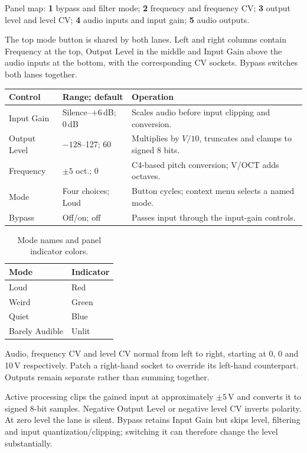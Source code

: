 Panel map: \textbf{1} bypass and filter mode;
\textbf{2} frequency and frequency CV;
\textbf{3} output level and level CV;
\textbf{4} audio inputs and input gain;
\textbf{5} audio outputs.

The top mode button is shared by both lanes. Left and right columns contain
Frequency at the top, Output Level in the middle and Input Gain above the
audio inputs at the bottom, with the corresponding CV sockets.
Bypass switches both lanes together.

\begin{tabularx}{\textwidth}{@{}l l X@{}}
\toprule Control & Range; default & Operation \\\midrule
Input Gain & Silence--$+6$\,dB; 0\,dB & Scales audio before input clipping and conversion. \\
Output Level & $-128$--127; 60 & Multiplies by $V/10$, truncates and clamps to signed 8 bits. \\
Frequency & $\pm5$ oct.; 0 & C4-based pitch conversion; V/OCT adds octaves. \\
Mode & Four choices; Loud & Button cycles; context menu selects a named mode. \\
Bypass & Off/on; off & Passes input through the input-gain controls. \\
\bottomrule
\end{tabularx}


\begin{table}[ht]\centering
\begin{tabular}{@{}ll@{}}
\toprule Mode & Indicator \\\midrule
Loud & Red \\
Weird & Green \\
Quiet & Blue \\
Barely Audible & Unlit \\\bottomrule
\end{tabular}
\caption{Mode names and panel indicator colors.}\label{tab:filter-modes}
\end{table}

Audio, frequency CV and level CV normal from left to right, starting
at 0, 0 and 10\,V respectively. Patch a right-hand socket to override its
left-hand counterpart. Outputs remain separate rather than summing together.

Active processing clips the gained input at approximately $\pm5$\,V and
converts it to signed 8-bit samples. Negative Output Level or negative level
CV inverts polarity. At zero level the lane is silent. Bypass retains Input
Gain but skips level, filtering and input quantization/clipping; switching
it can therefore change the level substantially.

